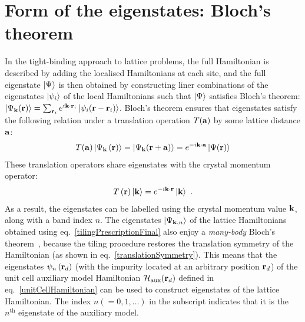 \documentclass[reprint,hidelinks]{revtex4-2}
\begin{document}
\section{Form of the eigenstates: Bloch's theorem}
In the tight-binding approach to lattice problems, the full Hamiltonian is described by adding the localised Hamiltonians at each site, and the full eigenstate \(\ket{\Psi}\) is then obtained by constructing liner combinations of the eigenstates \(\ket{\psi_i}\) of the local Hamiltonians such that \(\ket{\Psi}\) satisfies Bloch's theorem: \(\ket{\Psi_{\bf k}({\bf r})} = \sum_{{\bf r}_i} e^{i {\bf k}\cdot{\bf r}_i} \ket{\psi_i({\bf r} - {\bf r}_i)}\). Bloch's theorem ensures that eigenstates satisfy the following relation under a translation operation \(T({\bf a})\) by some lattice distance \({\bf a}\):
\begin{equation}\begin{aligned}
	T({\bf a})\ket{\Psi_{{\bf k}}\left({\bf r}\right)} = \ket{\Psi_{{\bf k}}({\bf r} + {\bf a})} = e^{-i{\bf k}\cdot{\bf a}}\ket{\Psi({\bf r})}
\end{aligned}\end{equation}
These translation operators share eigenstates with the crystal momentum operator:
\begin{equation}\begin{aligned}
	T\left( {\bf r} \right) \ket{{\bf k}} = e^{-i {\bf k}\cdot{\bf r}} \ket{{\bf k}}~.
\end{aligned}\end{equation}
As a result, the eigenstates can be labelled using the crystal momentum value \({\bf k}\), along with a band index \(n\). The eigenstates \(\ket{\Psi_{{\bf k},n}}\) of the lattice Hamiltonians obtained using eq.~\ref{tilingPrescriptionFinal} also enjoy a {\it many-body} Bloch's theorem~\cite{stoyanova}, because the tiling procedure restores the translation symmetry of the Hamiltonian (as shown in eq.~\ref{translationSymmetry}). This means that the eigenstates \(\psi_n\left({\bf r}_d\right)\) (with the impurity located at an arbitrary position \({\bf r}_d\)) of the unit cell auxiliary model Hamiltonian \(\mathcal{H}_\text{aux}({\bf r}_d)\) defined in eq.~\ref{unitCellHamiltonian} can be used to construct eigenstates of the lattice Hamiltonian. The index \(n(=0,1,\ldots)\) in the subscript indicates that it is the \(n^\text{th}\) eigenstate of the auxiliary model. 
\end{document}
